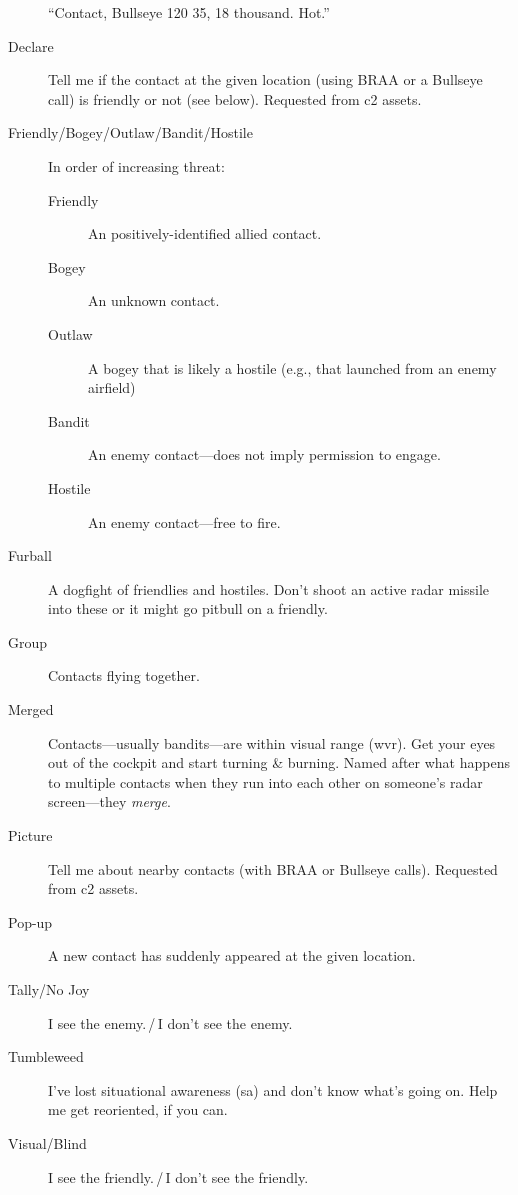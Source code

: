 \begin{description}
    ``Contact, Bullseye 120 35, 18 thousand. Hot.''

\item[Declare] Tell me if the contact at the given location
    (using BRAA or a Bullseye call) is friendly or not (see below).
    Requested from \ac{c2} assets.

\item[Friendly/Bogey/Outlaw/Bandit/Hostile]
    In order of increasing threat:
    \begin{description}
    \item[Friendly] An positively-identified allied contact.
    \item[Bogey] An unknown contact.
    \item[Outlaw] A bogey that is likely a hostile
        (e.g., that launched from an enemy airfield)
    \item[Bandit] An enemy contact---does not imply permission to engage.
    \item[Hostile] An enemy contact---free to fire.
    \end{description}

\item[Furball] A dogfight of friendlies and hostiles.
    Don't shoot an active radar missile into these or it might go pitbull
    on a friendly.

\item[Group] Contacts flying together.

\item[Merged] Contacts---usually bandits---are within visual range
    \ac{(wvr)}.
    Get your eyes out of the cockpit and start turning \& burning.
    Named after what happens to multiple contacts when they run into each other
    on someone's radar screen---they \emph{merge}.

\item[Picture] Tell me about nearby contacts (with BRAA or Bullseye calls).
    Requested from \ac{c2} assets.

\item[Pop-up] A new contact has suddenly appeared at the given location.

\item[Tally/No Joy] I see the enemy.\,/\,I don't see the enemy.

\item[Tumbleweed] I've lost situational awareness \ac{(sa)}
    and don't know what's going on.
    Help me get reoriented, if you can.

\item[Visual/Blind] I see the friendly.\,/\,I don't see the friendly.
\end{description}

